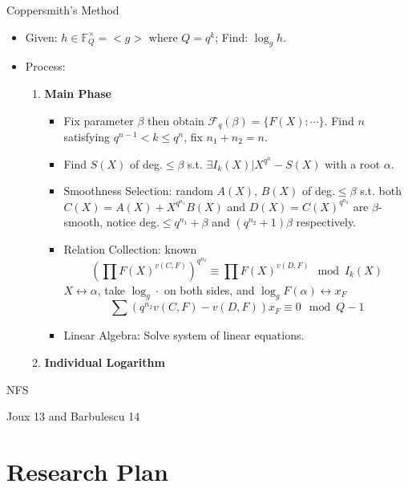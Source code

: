 \documentclass{beamer}
\begin{document}
		\begin{frame}{Coppersmith's Method}
			\begin{itemize}
				\item Given: $h \in \mathbb{F}_Q^\times = <g>$ where $Q = q^k$; Find: $\log_g h$.
					\pause
				\item Process:
					\begin{enumerate}
						\item \textbf{Main Phase}
							\begin{itemize}
								\item<3-> Fix parameter $\beta$ then obtain $\mathcal{F}_q(\beta) = \{F(X):\cdots\}$. 
									Find $n$ satisfying $q^{n-1} < k \leq q^n$, fix $n_1 + n_2 = n$. 								
								\item<4-> Find $S(X)$ of deg.$\leq\beta$ s.t. $\exists I_k(X)|X^{q^n} - S(X)$ with a root $\alpha$.
								\item<5-> \alert{Smoothness Selection}: random $A(X)$, $B(X)$ of deg.$\leq\beta$ s.t. 
									both $C(X) = A(X) + X^{q^{n_1}}B(X)$ and $D(X) = C(X)^{q^{n_2}}$ %
									are $\beta$-smooth, notice deg.$\leq q^{n_1} + \beta$ and $(q^{n_2} + 1)\beta$ respectively.
								\item<6-> \alert{Relation Collection}: known
									$$(\prod F(X)^{v(C, F)})^{q^{n_2}} \equiv \prod F(X)^{v(D, F)} \mod I_k(X)$$
									\pause
									$X \leftrightarrow \alpha$, take $\log_g\cdot$ on both sides, and $\log_g F(\alpha)\leftrightarrow x_F$
									$$\sum(q^{n_2} v(C, F) - v(D, F)) x_F \equiv 0 \mod Q - 1$$
								\item<7-> \alert{Linear Algebra}: Solve system of linear equations.
							\end{itemize}
						\item \textbf{Individual Logarithm} \uncover<8->{Descent Method.}
					\end{enumerate}
			\end{itemize}
		\end{frame}
		
		\begin{frame}{NFS}
		\end{frame}
		
		\begin{frame}{Joux 13 and Barbulescu 14}
		\end{frame}

\section{Research Plan}
\end{document}

